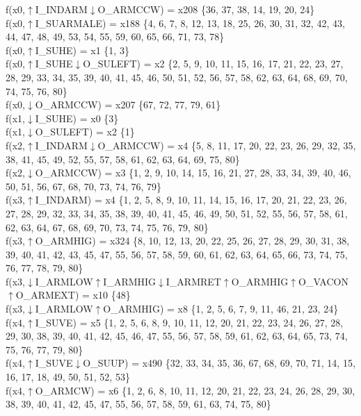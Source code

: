 f(x0,$\uparrow$I\_INDARM$\downarrow$O\_ARMCCW) = x208 \{36, 37, 38, 14, 19, 20, 24\} \\  
f(x0,$\uparrow$I\_SUARMALE) = x188 \{4, 6, 7, 8, 12, 13, 18, 25, 26, 30, 31, 32, 42, 43, 44, 47, 48, 49, 53, 54, 55, 59, 60, 65, 66, 71, 73, 78\} \\  
f(x0,$\uparrow$I\_SUHE) = x1 \{1, 3\} \\  
f(x0,$\uparrow$I\_SUHE$\downarrow$O\_SULEFT) = x2 \{2, 5, 9, 10, 11, 15, 16, 17, 21, 22, 23, 27, 28, 29, 33, 34, 35, 39, 40, 41, 45, 46, 50, 51, 52, 56, 57, 58, 62, 63, 64, 68, 69, 70, 74, 75, 76, 80\} \\  
f(x0,$\downarrow$O\_ARMCCW) = x207 \{67, 72, 77, 79, 61\} \\  
f(x1,$\downarrow$I\_SUHE) = x0 \{3\} \\  
f(x1,$\downarrow$O\_SULEFT) = x2 \{1\} \\  
f(x2,$\uparrow$I\_INDARM$\downarrow$O\_ARMCCW) = x4 \{5, 8, 11, 17, 20, 22, 23, 26, 29, 32, 35, 38, 41, 45, 49, 52, 55, 57, 58, 61, 62, 63, 64, 69, 75, 80\} \\  
f(x2,$\downarrow$O\_ARMCCW) = x3 \{1, 2, 9, 10, 14, 15, 16, 21, 27, 28, 33, 34, 39, 40, 46, 50, 51, 56, 67, 68, 70, 73, 74, 76, 79\} \\  
f(x3,$\uparrow$I\_INDARM) = x4 \{1, 2, 5, 8, 9, 10, 11, 14, 15, 16, 17, 20, 21, 22, 23, 26, 27, 28, 29, 32, 33, 34, 35, 38, 39, 40, 41, 45, 46, 49, 50, 51, 52, 55, 56, 57, 58, 61, 62, 63, 64, 67, 68, 69, 70, 73, 74, 75, 76, 79, 80\} \\  
f(x3,$\uparrow$O\_ARMHIG) = x324 \{8, 10, 12, 13, 20, 22, 25, 26, 27, 28, 29, 30, 31, 38, 39, 40, 41, 42, 43, 45, 47, 55, 56, 57, 58, 59, 60, 61, 62, 63, 64, 65, 66, 73, 74, 75, 76, 77, 78, 79, 80\} \\  
f(x3,$\downarrow$I\_ARMLOW$\uparrow$I\_ARMHIG$\downarrow$I\_ARMRET$\uparrow$O\_ARMHIG$\uparrow$O\_VACON$\uparrow$O\_ARMEXT) = x10 \{48\} \\  
f(x3,$\downarrow$I\_ARMLOW$\uparrow$O\_ARMHIG) = x8 \{1, 2, 5, 6, 7, 9, 11, 46, 21, 23, 24\} \\  
f(x4,$\uparrow$I\_SUVE) = x5 \{1, 2, 5, 6, 8, 9, 10, 11, 12, 20, 21, 22, 23, 24, 26, 27, 28, 29, 30, 38, 39, 40, 41, 42, 45, 46, 47, 55, 56, 57, 58, 59, 61, 62, 63, 64, 65, 73, 74, 75, 76, 77, 79, 80\} \\  
f(x4,$\uparrow$I\_SUVE$\downarrow$O\_SUUP) = x490 \{32, 33, 34, 35, 36, 67, 68, 69, 70, 71, 14, 15, 16, 17, 18, 49, 50, 51, 52, 53\} \\  
f(x4,$\uparrow$O\_ARMCW) = x6 \{1, 2, 6, 8, 10, 11, 12, 20, 21, 22, 23, 24, 26, 28, 29, 30, 38, 39, 40, 41, 42, 45, 47, 55, 56, 57, 58, 59, 61, 63, 74, 75, 80\} \\  
